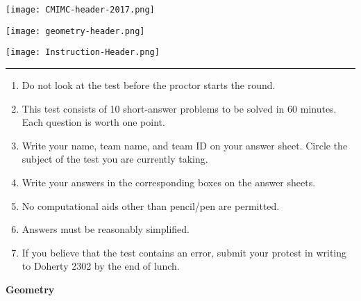 \documentclass[10pt]{article}
\begin{document}
\thispagestyle{empty}
\begin{center}

\vspace*{90pt}

\texttt{[image: CMIMC-header-2017.png]}

\texttt{[image: geometry-header.png]}

\vspace{1.6in}

\texttt{[image: Instruction-Header.png]}
\noindent\rule{17.7cm}{2pt}
\end{center}

\vspace{10pt}

\begin{enumerate}
\large
\item Do not look at the test before the proctor starts the round.

\item This test consists of 10 short-answer problems to be solved in 60 minutes.
	Each question is worth one point.

\item Write your name, team name, and team ID on your answer sheet. Circle the
	subject of the test you are currently taking.

\item Write your answers in the corresponding boxes on the answer sheets.

\item No computational aids other than pencil/pen are permitted.

\item Answers must be reasonably simplified.

\item If you believe that the test contains an error, submit your protest in writing to Doherty 2302 by the end of lunch.
\end{enumerate}
\newpage

\begin{center}
\huge\textbf{Geometry}\normalsize

\vspace{3pt}
\end{center}
\end{document}
